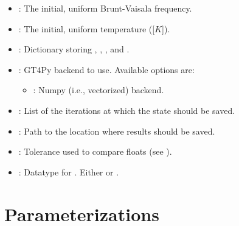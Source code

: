 \documentclass[letterpaper,10pt,english]{sphinxmanual}
\begin{document}
\begin{description}
\begin{itemize}
\item {} 
: The initial, uniform Brunt-Vaisala frequency.

\item {} 
: The initial, uniform temperature ({[}\(K\){]}).

\item {} 
: Dictionary storing ,               , ,          and .

\item {} 
: GT4Py backend to use. Available options are:
\begin{itemize}
\item {} 
: Numpy (i.e., vectorized) backend.

\end{itemize}

\item {} 
: List of the iterations at which the state should be saved.

\item {} 
: Path to the location where results should be saved.

\item {} 
: Tolerance used to compare floats (see ).

\item {} 
: Datatype for . Either  or .

\end{itemize}

\end{description}


\section{Parameterizations}
\label{\detokenize{api:parameterizations}}
\end{document}
